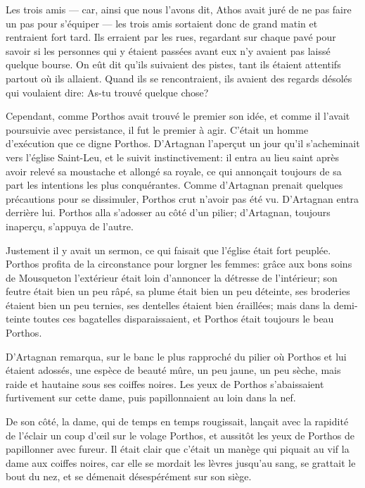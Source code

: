 Les trois amis --- car, ainsi que nous l'avons dit, Athos avait juré de ne pas faire un pas pour s'équiper --- les trois amis sortaient donc de grand matin et rentraient fort tard. Ils erraient par les rues, regardant sur chaque pavé pour savoir si les personnes qui y étaient passées avant eux n'y avaient pas laissé quelque bourse. On eût dit qu'ils suivaient des pistes, tant ils étaient attentifs partout où ils allaient. Quand ils se rencontraient, ils avaient des regards désolés qui voulaient dire: As-tu trouvé quelque chose? 

Cependant, comme Porthos avait trouvé le premier son idée, et comme il l'avait poursuivie avec persistance, il fut le premier à agir. C'était un homme d'exécution que ce digne Porthos. D'Artagnan l'aperçut un jour qu'il s'acheminait vers l'église Saint-Leu, et le suivit instinctivement: il entra au lieu saint après avoir relevé sa moustache et allongé sa royale, ce qui annonçait toujours de sa part les intentions les plus conquérantes. Comme d'Artagnan prenait quelques précautions pour se dissimuler, Porthos crut n'avoir pas été vu. D'Artagnan entra derrière lui. Porthos alla s'adosser au côté d'un pilier; d'Artagnan, toujours inaperçu, s'appuya de l'autre. 

Justement il y avait un sermon, ce qui faisait que l'église était fort peuplée. Porthos profita de la circonstance pour lorgner les femmes: grâce aux bons soins de Mousqueton l'extérieur était loin d'annoncer la détresse de l'intérieur; son feutre était bien un peu râpé, sa plume était bien un peu déteinte, ses broderies étaient bien un peu ternies, ses dentelles étaient bien éraillées; mais dans la demi-teinte toutes ces bagatelles disparaissaient, et Porthos était toujours le beau Porthos. 

D'Artagnan remarqua, sur le banc le plus rapproché du pilier où Porthos et lui étaient adossés, une espèce de beauté mûre, un peu jaune, un peu sèche, mais raide et hautaine sous ses coiffes noires. Les yeux de Porthos s'abaissaient furtivement sur cette dame, puis papillonnaient au loin dans la nef. 

De son côté, la dame, qui de temps en temps rougissait, lançait avec la rapidité de l'éclair un coup d'œil sur le volage Porthos, et aussitôt les yeux de Porthos de papillonner avec fureur. Il était clair que c'était un manège qui piquait au vif la dame aux coiffes noires, car elle se mordait les lèvres jusqu'au sang, se grattait le bout du nez, et se démenait désespérément sur son siège. 

